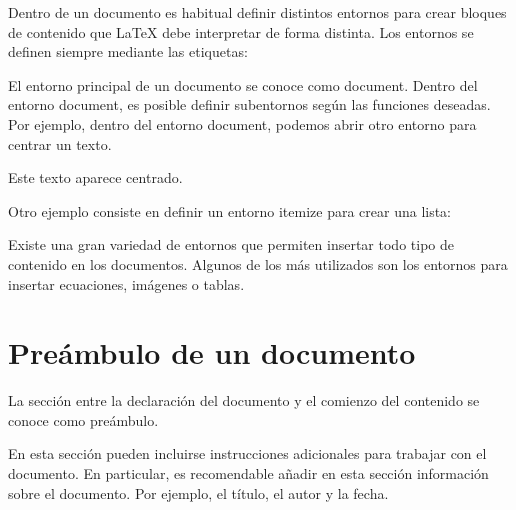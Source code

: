 \documentclass[11pt, a4paper]{article}
\begin{document}
Dentro de un documento es habitual definir distintos entornos para crear bloques de contenido que LaTeX debe interpretar de forma distinta. Los entornos se definen siempre mediante las etiquetas:

	
	
El entorno principal de un documento se conoce como document. Dentro del entorno document, es posible definir subentornos según las funciones deseadas. Por ejemplo, dentro del entorno document, podemos abrir otro entorno para centrar un texto.

	
	
	Este texto aparece centrado.
	
	
	
Otro ejemplo consiste en definir un entorno itemize para crear una lista:

	
	
	
	 
	
	 
	
	

Existe una gran variedad de entornos que permiten insertar todo tipo de contenido en los documentos. Algunos de los más utilizados son los entornos para insertar ecuaciones, imágenes o tablas.

\section{Preámbulo de un documento}

La sección entre la declaración del documento y el comienzo del contenido se conoce como preámbulo.

En esta sección pueden incluirse instrucciones adicionales para trabajar con el documento. En particular, es recomendable añadir en esta sección información sobre el documento. Por ejemplo, el título, el autor y la fecha.


\end{document}
